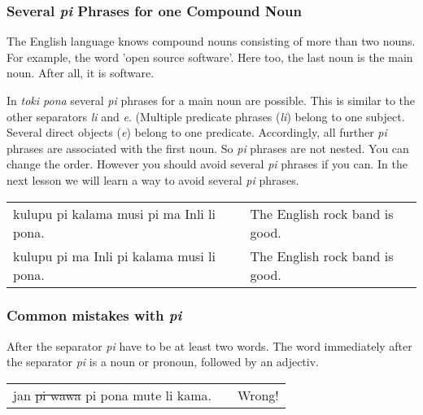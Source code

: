 %
\subsubsection*{Several \textit{pi} Phrases for one Compound Noun} 
%

The English language knows compound nouns consisting of more than two nouns. 
For example, the word 'open source software'.  
Here too, the last noun is the main noun. 
After all, it is software. 

In \textit{toki pona} several \textit{pi} phrases for a main noun are possible. 
This is similar to the other separators \textit{li} and \textit{e}. 
(Multiple predicate phrases (\textit{li}) belong to one subject. 
Several direct objects (\textit{e}) belong to one predicate.
Accordingly, all further \textit{pi} phrases are associated with the first noun. 
So \textit{pi} phrases are not nested. 
You can change the order. 
However you should avoid several \textit{pi} phrases if you can. 
In the next lesson we will learn a way to avoid several \textit{pi} phrases.

\begin{supertabular}{p{5,5cm}|ll}
kulupu pi kalama musi pi ma Inli li pona. &&  The English rock band is good. \\ 
kulupu pi ma Inli pi kalama musi li pona. &&  The English rock band is good. \\ 
\end{supertabular}

% 
\newpage
%
\subsubsection*{Common mistakes with \textit{pi}}
\label{'mistakes_with_pi'}
%

After the separator \textit{pi} have to be at least two words. 
The word immediately after the separator \textit{pi} is a noun or pronoun, followed by an adjectiv.

\begin{supertabular}{p{5,5cm}|ll}
jan \sout{pi wawa} pi pona mute li kama. && Wrong! \\ %
\end{supertabular}

